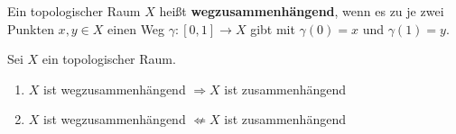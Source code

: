 \begin{definition}
    Ein topologischer Raum $X$ heißt \textbf{wegzusammenhängend},
    wenn es zu je zwei Punkten $x,y \in X$ einen Weg $\gamma:[0,1] \rightarrow X$
    gibt mit $\gamma(0)=x$ und $\gamma(1)=y$.
\end{definition}

\begin{korollar}\label{kor:wegzusammehang-impliziert-zusammenhang}
    Sei $X$ ein topologischer Raum.

    \begin{enumerate}[label=(\roman*)]
        \item $X$ ist wegzusammenhängend $\Rightarrow X$ ist zusammenhängend
        \item $X$ ist wegzusammenhängend $\not\Leftarrow X$ ist zusammenhängend
    \end{enumerate}
\end{korollar}


